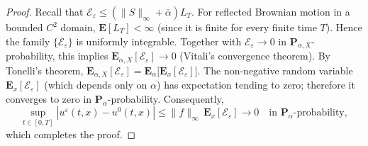 \documentclass[10pt,a4paper]{amsart}
\begin{document}
\begin{proof}
	Recall that $\mathcal E_\varepsilon \le (\|S\|_\infty+\bar\alpha)L_T$. For reflected Brownian motion in a bounded $C^2$ domain, $\mathbf E[L_T]<\infty$ (since it is finite for every finite time \(T\)). Hence the family $\{\mathcal E_\varepsilon\}$ is uniformly integrable. Together with $\mathcal E_\varepsilon\to0$ in $\mathbf P_{\alpha,X}$-probability, this implies $\mathbf E_{\alpha,X}[\mathcal E_\varepsilon]\to0$ (Vitali's convergence theorem).
	By Tonelli's theorem,
	$\mathbf E_{\alpha,X}[\mathcal E_\varepsilon] = \mathbf E_\alpha\bigl[\mathbf E_x[\mathcal E_\varepsilon]\bigr]$.
	The non‑negative random variable $\mathbf E_x[\mathcal E_\varepsilon]$ (which depends only on $\alpha$)
	has expectation tending to zero; therefore it converges to zero in $\mathbf P_\alpha$-probability.
	Consequently,
	\[
	\sup_{t\in[0,T]}|u^\varepsilon(t,x)-u^0(t,x)|\le \|f\|_\infty\,\mathbf E_x[\mathcal E_\varepsilon]
	\longrightarrow 0\quad\text{in }\mathbf P_\alpha\text{-probability},
	\]
	which completes the proof.
\end{proof}
\end{document}
